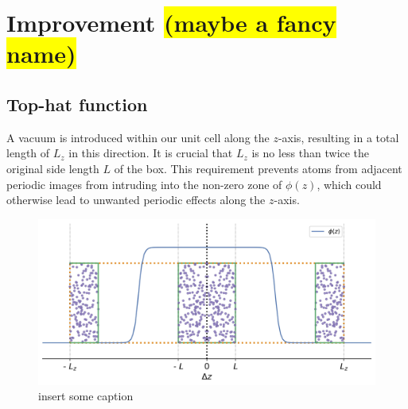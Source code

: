 \section{Improvement \colorbox{yellow}{(maybe a fancy name)}}
\subsection{Top-hat function}
A vacuum is introduced within our unit cell along the $z$-axis, resulting in a total length of $L_{z}$ in this direction. It is crucial that $L_{z}$ is no less than twice the original side length $L$ of the box. This requirement prevents atoms from adjacent periodic images from intruding into the non-zero zone of $\phi(z)$, which could otherwise lead to unwanted periodic effects along the $z$-axis.
\begin{figure}[H]%
    \centering
    \includegraphics[width=0.65\linewidth]{images/simulationcell.jpg}
    \caption{insert some caption}
    \label{fig:simulation_cell}
\end{figure}

